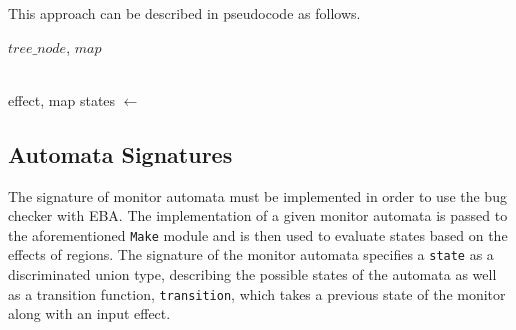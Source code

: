 \newpar This approach can be described in pseudocode as follows.

\begin{algorithm}[H]
\begin{algorithmic}
     {$tree\_node$, $map$} 
            \EndIf
            

        \EndIf      
    \EndFunction
    \\
     {effect, map}
        \State states $\gets$ 
    \EndFunction
    \\
\end{algorithmic}
\end{algorithm}

\subsection{Automata Signatures}

The signature of monitor automata must be implemented in order to use the bug checker with EBA. The implementation of a given monitor automata is passed to the aforementioned \texttt{Make} module and is then used to evaluate states based on the effects of regions. The signature of the monitor automata specifies a \texttt{state} as a discriminated union type, describing the possible states of the automata as well as a transition function, \texttt{transition}, which takes a previous state of the monitor along with an input effect. 

